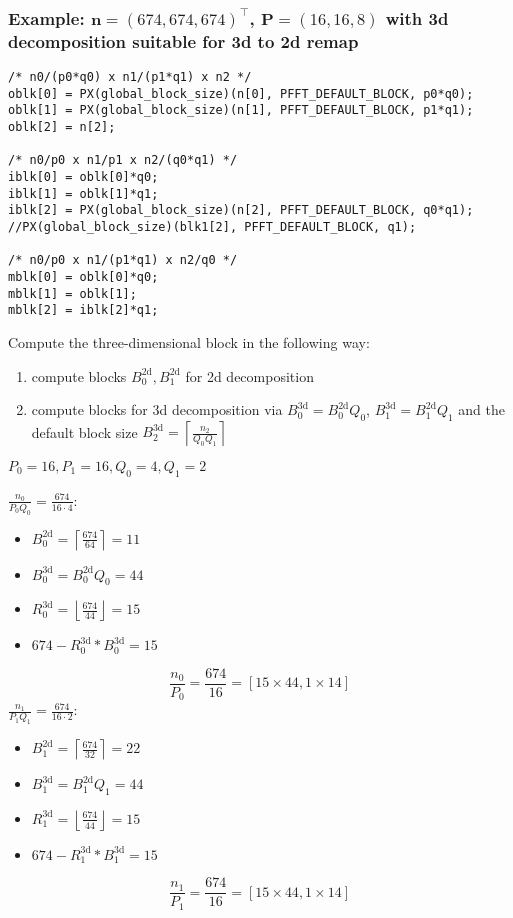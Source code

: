 \subsubsection{Example: $\mathbf n=(674, 674, 674)^\top$, $\mathbf P = (16,16,8)$ with 3d decomposition suitable for 3d to 2d remap}

\begin{lstlisting}
/* n0/(p0*q0) x n1/(p1*q1) x n2 */
oblk[0] = PX(global_block_size)(n[0], PFFT_DEFAULT_BLOCK, p0*q0);
oblk[1] = PX(global_block_size)(n[1], PFFT_DEFAULT_BLOCK, p1*q1);
oblk[2] = n[2];

/* n0/p0 x n1/p1 x n2/(q0*q1) */
iblk[0] = oblk[0]*q0;
iblk[1] = oblk[1]*q1;
iblk[2] = PX(global_block_size)(n[2], PFFT_DEFAULT_BLOCK, q0*q1);
//PX(global_block_size)(blk1[2], PFFT_DEFAULT_BLOCK, q1);

/* n0/p0 x n1/(p1*q1) x n2/q0 */
mblk[0] = oblk[0]*q0;
mblk[1] = oblk[1];
mblk[2] = iblk[2]*q1;
\end{lstlisting}

Compute the three-dimensional block in the following way:
\begin{enumerate}
 \item compute blocks $B_0^\textrm{2d}, B_1^\textrm{2d}$ for 2d decomposition
 \item compute blocks for 3d decomposition via $B_0^\textrm{3d} = B_0^\textrm{2d} Q_0$, $B_1^\textrm{3d} = B_1^\textrm{2d} Q_1$ and the default block size $B_2^\textrm{3d} = \left\lceil\frac{n_2}{Q_0Q_1}\right\rceil$
\end{enumerate}


$P_0 = 16, P_1 = 16, Q_0=4, Q_1=2$

$\frac{n_0}{P_0Q_0} = \frac{674}{16\cdot 4}$:
\begin{itemize}
 \item $B_0^\textrm{2d} = \left\lceil \frac{674}{64} \right\rceil = 11$
 \item $B_0^\textrm{3d} = B_0^\textrm{2d}Q_0 = 44$
 \item $R_0^\textrm{3d} = \left\lfloor \frac{674}{44} \right\rfloor = 15$
 \item $674 - R_0^\textrm{3d}*B_0^\textrm{3d} = 15$
\end{itemize}
\begin{equation*}
  \frac{n_0}{P_0} = \frac{674}{16} = \left[15\times 44, 1\times 14 \right]
\end{equation*}
$\frac{n_1}{P_1Q_1} = \frac{674}{16\cdot 2}$:
\begin{itemize}
 \item $B_1^\textrm{2d} = \left\lceil \frac{674}{32} \right\rceil = 22$
 \item $B_1^\textrm{3d} = B_1^\textrm{2d}Q_1 = 44$
 \item $R_1^\textrm{3d} = \left\lfloor \frac{674}{44} \right\rfloor = 15$
 \item $674 - R_1^\textrm{3d}*B_1^\textrm{3d} = 15$
\end{itemize}
\begin{equation*}
  \frac{n_1}{P_1} = \frac{674}{16} = \left[15\times 44, 1\times 14 \right]
\end{equation*}

